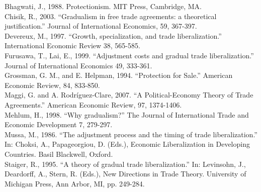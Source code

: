 \documentclass[12pt]{article}
\begin{document}
\noindent\normalsize Bhagwati, J., 1988. Protectionism. MIT Press, Cambridge, MA. \\

\noindent Chisik, R., 2003. ``Gradualism in free trade agreements: a theoretical justification.'' Journal of International Economics, 59, 367-397. \\

\noindent Devereux, M., 1997. ``Growth, specialization, and trade liberalization.'' International Economic Review
38, 565-585. \\

\noindent Furusawa, T., Lai, E., 1999. ``Adjustment costs and gradual trade liberalization.'' Journal of International
Economics 49, 333-361. \\

\noindent Grossman, G. M., and E. Helpman, 1994. ``Protection for Sale.'' American Economic Review, 84, 833-850. \\

\noindent Maggi, G. and A. Rodr\'{i}guez-Clare, 2007. ``A Political-Economy Theory of Trade Agreements.'' American Economic Review, 97, 1374-1406. \\

\noindent Mehlum, H., 1998. ``Why gradualism?'' The Journal of International Trade and Economic Development 7, 279-297. \\

\noindent Mussa, M., 1986. ``The adjustment process and the timing of trade liberalization.'' In: Choksi, A., Papageorgiou, D. (Eds.), Economic Liberalization in Developing Countries. Basil Blackwell, Oxford. \\

\noindent Staiger, R., 1995. ``A theory of gradual trade liberalization.'' In: Levinsohn, J., Deardorff, A., Stern, R.
(Eds.), New Directions in Trade Theory. University of Michigan Press, Ann Arbor, MI, pp. 249-284. \\
\end{document}
